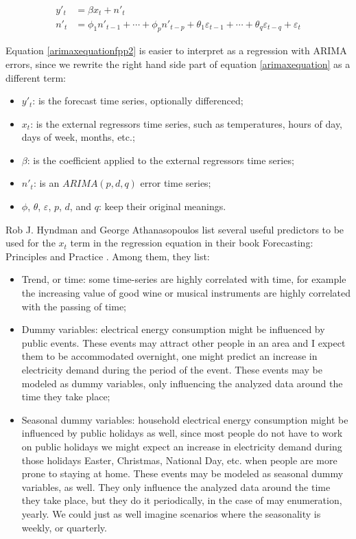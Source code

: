 \documentclass[12pt,a4paper,titlepage]{report}
\begin{document}
\begin{equation}
\begin{split}
y'_{t} &= \beta x_{t} + n'_{t} \\
n'_{t} &= \phi_{1} n'_{t-1} + \cdots + \phi_{p} n'_{t-p} + \theta_{1} \varepsilon_{t-1} + \cdots + \theta_{q} \varepsilon_{t-q} + \varepsilon_{t}
\end{split}
\label{arimaxequationfpp2}
\end{equation}

Equation \ref{arimaxequationfpp2} is easier to interpret as a regression with ARIMA errors, since we rewrite the right hand side part of equation \ref{arimaxequation} as a different term:
\begin{itemize}
    \item $ y'_{t} $: is the forecast time series, optionally differenced;
    \item $ x_{t} $: is the external regressors time series, such as temperatures, hours of day, days of week, months, etc.;
    \item $ \beta $: is the coefficient applied to the external regressors time series;
    \item $ n'_{t} $: is an $ ARIMA(p, d, q) $ error time series;
    \item $ \phi $, $ \theta $, $ \varepsilon $, $ p $, $ d $, and $ q $: keep their original meanings.
\end{itemize}

Rob J. Hyndman and George Athanasopoulos list several useful predictors \cite{fpp2usefulpredictors} to be used for the $ x_{t} $ term in the regression equation in their book Forecasting: Principles and Practice \cite{fpp2}. Among them, they list:

\begin{itemize}
    \item Trend, or time: some time-series are highly correlated with time, for example the increasing value of good wine or musical instruments are highly correlated with the passing of time;
    \item Dummy variables: electrical energy consumption might be influenced by public events. These events may attract other people in an area and I expect them to be accommodated overnight, one might predict an increase in electricity demand during the period of the event. These events may be modeled as dummy variables, only influencing the analyzed data around the time they take place;
    \item Seasonal dummy variables: household electrical energy consumption might be influenced by public holidays as well, since most people do not have to work on public holidays we might expect an increase in electricity demand during those holidays Easter, Christmas, National Day, etc. when people are more prone to staying at home. These events may be modeled as seasonal dummy variables, as well. They only influence the analyzed data around the time they take place, but they do it periodically, in the case of may enumeration, yearly. We could just as well imagine scenarios where the seasonality is weekly, or quarterly.
\end{itemize}
\end{document}
